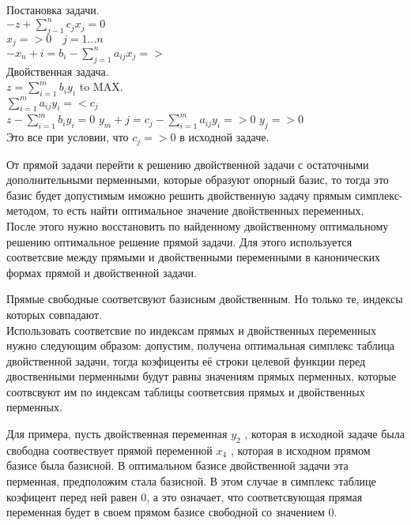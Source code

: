Постановка задачи.\\
$-z + \sum \limits_{j-1}^n c_j x_j = 0$\\
$x_j => 0 \quad j=1...n$\\
$ - x_n+i =  b_i  - \sum \limits_{j=1}^n a_{ij} x_j =>  $\\

Двойственная задача.\\


$z = \sum \limits_{i=1}^m b_i y_i $ to MAX.\\
$ \sum \limits_{i=1}^m a_{ij} y_i =< c_j $\\

$ z -\sum \limits_{i=1}^m b_i y_i = 0  $
$y_m+j = c_j - \sum \limits_{i=1}^m a_{ij} y_i => 0 $
$y_j => 0 $\\

Это все при условии, что $c_j => 0$ в исходной задаче.

От прямой задачи перейти к решению двойственной задачи с остаточными дополнительными перменными, которые образуют опорный базис,
то тогда это базис будет допустимым иможно решить двойственную задачу прямым симплекс-методом,
то есть найти оптимальное значение двойственных переменных.\\

После этого нужно восстановить по найденному двойственному оптимальному решению оптимальное решение прямой задачи.
Для этого используется соответсвие между прямыми и двойственными переменными в канонических формах прямой и двойственной задачи.

Прямые свободные соответсвуют базисным двойственным. Но только те, индексы которых совпадают.\\


Использовать соответсвие по индексам прямых и двойственных переменных нужно следующим образом:
допустим, получена оптимальная симплекс таблица двойственной задачи,
тогда коэфиценты её строки целевой функции перед двоственными перменными будут равны значениям прямых перменных,
которые соотвсвуют им по индексам таблицы соответсвия прямых и двойственных перменных.

Для примера, пусть двойственная переменная $y_2$ , которая в исходной задаче была свободна соотвествует прямой переменной $x_4$ ,
которая в исходном прямом базисе была базисной.
В оптимальном базисе двойственной задачи эта перменная, предположим стала базисной.
В этом случае в симплекс таблице коэфицент перед ней равен 0,
а это означает, что соответсвующая прямая переменная будет в своем прямом базисе свободной со значением 0.

